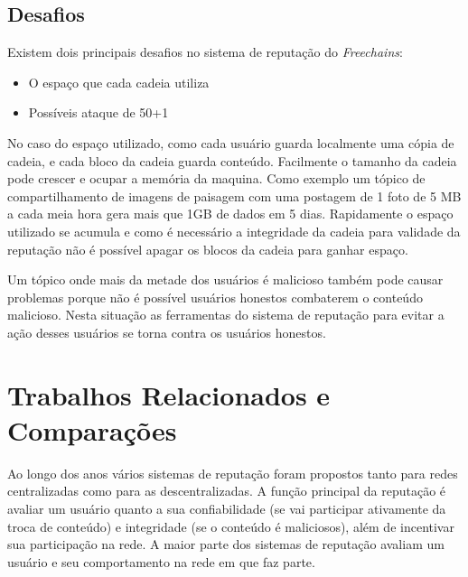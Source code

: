\documentclass[12pt]{article}
\newcommand{\FC} {\emph{Freechains}\xspace}
\begin{document}
\begin{comment}
Outra medida que visa incentivar usuários a avaliarem o conteúdo da rede com \emph{likes} e \emph{dislikes} é o limite de 3 meses nos quais as unidades de \emph{rep} são válidas. Após 3 meses qualquer \emph{rep} não utilizado é deletado e perdido. 

Por fim, usuários sem reputação não podem propagar mensagens, ou seja, suas postagens ficam retidas e não são retransmitidas até que o usuário possa pagar a taxa de um \emph{rep}. Essa medida ajuda a manter a rede honesta e evita ataques de usuários maliciosos pois eles não conseguem mandar mensagens quando sua reputação e menor ou igual a zero.

\end{comment}

\subsection{Desafios} \label{subsec:fraq}

Existem dois principais desafios no sistema de reputação do \FC:

\begin{itemize}
    \item O espaço que cada cadeia utiliza
    \item Possíveis ataque de 50+1%
\end{itemize}

No caso do espaço utilizado, como cada usuário guarda localmente uma cópia de cadeia, e cada bloco da cadeia guarda conteúdo. Facilmente o tamanho da cadeia pode crescer e ocupar a memória da maquina. Como exemplo um tópico de compartilhamento de imagens de paisagem com uma postagem de 1 foto de 5 MB a cada meia hora gera mais que 1GB de dados em 5 dias. Rapidamente o espaço utilizado se acumula e como é necessário a integridade da cadeia para validade da reputação não é possível apagar os blocos da cadeia para ganhar espaço.

Um tópico onde mais da metade dos usuários é malicioso também pode causar problemas porque não é possível usuários honestos combaterem o conteúdo malicioso. Nesta situação as ferramentas do sistema de reputação para evitar a ação desses usuários se torna contra os usuários honestos.

\section{Trabalhos Relacionados e Comparações} \label{sec:trabrec}

Ao longo dos anos vários sistemas de reputação foram propostos tanto para redes centralizadas como para as descentralizadas. A função principal da reputação é avaliar um usuário quanto a sua confiabilidade (se vai participar ativamente da troca de conteúdo) e integridade (se o conteúdo é maliciosos), além de incentivar sua participação na rede. A maior parte dos sistemas de reputação avaliam um usuário e seu comportamento na rede em que faz parte. 
\end{document}
